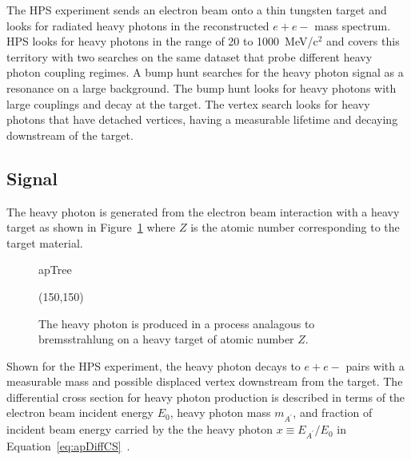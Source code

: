 The HPS experiment sends an electron beam onto a thin tungsten target and looks for radiated heavy photons in the reconstructed $e+e-$ mass spectrum. HPS looks for heavy photons in the range of 20 to 1000~MeV/c$^2$ and covers this territory with two searches on the same dataset that probe different heavy photon coupling regimes. A bump hunt searches for the heavy photon signal as a resonance on a large background. The bump hunt looks for heavy photons with large couplings and decay at the target. The vertex search looks for heavy photons that have detached vertices, having a measurable lifetime and decaying downstream of the target. 

\subsection{Signal}

The heavy photon is generated from the electron beam interaction with a heavy target as shown in Figure~\ref{fig:apTree} where $Z$ is the atomic number corresponding to the target material.  

\begin{figure}[H]
    \begin{center}
	\begin{fmffile}{apTree}
	\begin{fmfgraph*}(150,150)
	\fmfstraight
		\fmffreeze
		\fmffreeze	
	\end{fmfgraph*}
	\end{fmffile}
  	\end{center}
    	\caption[Heavy photon production in a fixed-target experiment]{The heavy photon is produced in a process analagous to bremsstrahlung on a heavy target of atomic number $Z$.}
   	 \label{fig:apTree}	
\end{figure}

Shown for the HPS experiment, the heavy photon decays to $e+e-$ pairs with a measurable mass and possible displaced vertex downstream from the target. The differential cross section for heavy photon production is described in terms of the electron beam incident energy $E_0$, heavy photon mass $m_{A^{\prime}}$, and fraction of incident beam energy carried by the the heavy photon $x\equiv E_{A^{\prime}}/E_0$ in Equation~\eqref{eq:apDiffCS}~\cite{toro}. 

